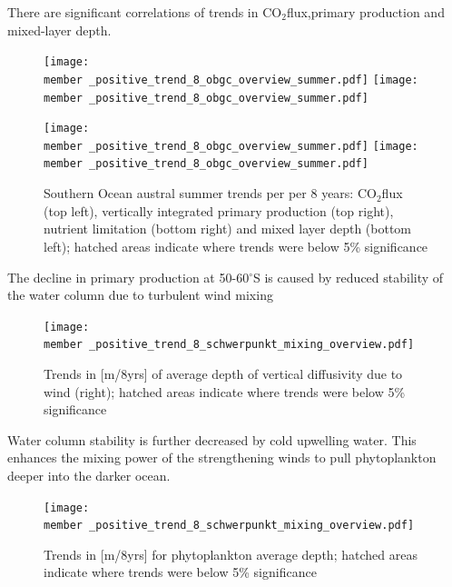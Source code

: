 \documentclass[aspectratio=169]{beamer}
\newcommand{\member}{m182_1988_1995} %
\begin{document}
\begin{frame}{There are significant correlations of trends in CO$_2$flux,primary production and mixed-layer depth.}
	
	\begin{figure}
		\centering
		\texttt{[image: \\member \_positive\_trend\_8\_obgc\_overview\_summer.pdf]} %
\texttt{[image: \\member \_positive\_trend\_8\_obgc\_overview\_summer.pdf]} %

\texttt{[image: \\member \_positive\_trend\_8\_obgc\_overview\_summer.pdf]} %
\texttt{[image: \\member \_positive\_trend\_8\_obgc\_overview\_summer.pdf]} %
\caption{Southern Ocean austral summer trends per per 8 years: CO$_2$flux (top left), vertically integrated primary production (top right), nutrient limitation (bottom right) and mixed layer depth (bottom left); hatched areas indicate where trends were below 5\% significance}
\label{fig:co2flux_intpp}
	\end{figure}
\end{frame}	

\begin{frame}{The decline in primary production at 50-60$^\circ$S is caused by reduced stability of the water column due to turbulent wind mixing \citep{Sverdrup1953}}

	\begin{figure}
		\centering
		\texttt{[image: \\member \_positive\_trend\_8\_schwerpunkt\_mixing\_overview.pdf]}
\caption{Trends in [m/8yrs] of average depth of vertical diffusivity due to wind (right); hatched areas indicate where trends were below 5\% significance}
\label{fig:wind_mixing}
	\end{figure}
	
\end{frame}

\begin{frame}{Water column stability is further decreased by cold upwelling water. This enhances the mixing power of the strengthening winds to pull phytoplankton deeper into the darker ocean.}
	\begin{figure}
		\centering
		\texttt{[image: \\member \_positive\_trend\_8\_schwerpunkt\_mixing\_overview.pdf]}
		\caption{Trends in [m/8yrs] for phytoplankton average depth; hatched areas indicate where trends were below 5\% significance}
	\label{fig:wind_mixing}	
	\end{figure}

\end{frame}
\end{document}
